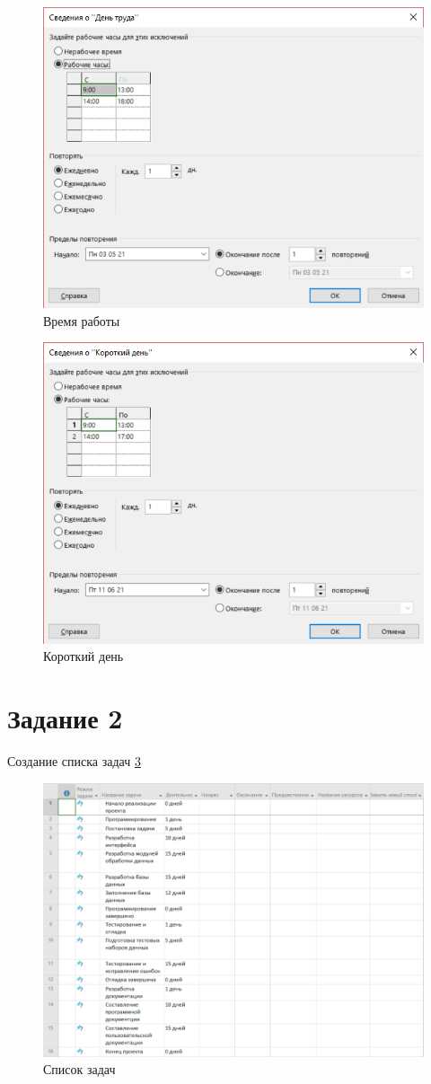 \begin{figure}[H]
	\centering
	\includegraphics[width=0.7\linewidth]{src/3}
	\caption{Время работы}
	\label{fig:3}
\end{figure}
\begin{figure}[H]
	\centering
	\includegraphics[width=0.7\linewidth]{src/4}
	\caption{Короткий день}
	\label{fig:4}
\end{figure}

\section{Задание 2}
Создание списка задач \ref{fig:5}
\begin{figure}[H]
	\centering
	\includegraphics[width=0.7\linewidth]{src/5}
	\caption{Список задач}
	\label{fig:5}
\end{figure}

